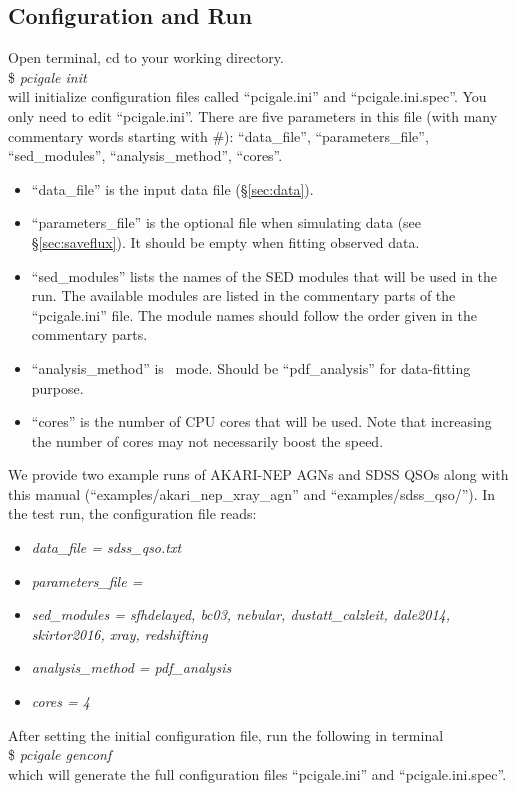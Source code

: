 \subsection{Configuration and Run}\label{sec:config}
Open terminal, cd to your working directory. \\
\$ \textit{pcigale init} \\
will initialize configuration files called ``pcigale.ini'' and ``pcigale.ini.spec''.
You only need to edit ``pcigale.ini''.
There are five parameters in this file (with many commentary words starting with \#): ``data\_file'', ``parameters\_file'', ``sed\_modules'', ``analysis\_method'', ``cores''. 
\begin{itemize}
    \item ``data\_file'' is the input data file (\S\ref{sec:data}). 
    \item ``parameters\_file'' is the optional file when simulating data (see \S\ref{sec:saveflux}). It should be  empty when fitting observed data. 
    \item ``sed\_modules'' lists the names of the SED modules that will be used in the run. 
    The available modules are listed in the commentary parts of the ``pcigale.ini'' file. 
    The module names should follow the order given in the commentary parts. 
    \item ``analysis\_method'' is \xcig\ mode. Should be ``pdf\_analysis'' for data-fitting purpose.
    \item ``cores'' is the number of CPU cores that will be used. Note that increasing the number of cores may not necessarily boost the speed. 
\end{itemize}
We provide two example runs of \hbox{AKARI-NEP} AGNs and SDSS QSOs \citep{yang20} along with this manual (``examples/akari\_nep\_xray\_agn'' and ``examples/sdss\_qso/''). 
In the test run, the configuration file reads:
\begin{itemize}
    \item[] \textit{data\_file = sdss\_qso.txt}
    \item[] \textit{parameters\_file = }
    \item[] \textit{sed\_modules = sfhdelayed, bc03, nebular, dustatt\_calzleit, dale2014, skirtor2016, xray, redshifting}
    \item[] \textit{analysis\_method = pdf\_analysis}
    \item[] \textit{cores = 4}
\end{itemize}
After setting the initial configuration file, run the following in terminal\\
\$ \textit{pcigale genconf} \\
which will generate the full configuration files ``pcigale.ini'' and ``pcigale.ini.spec''. 

